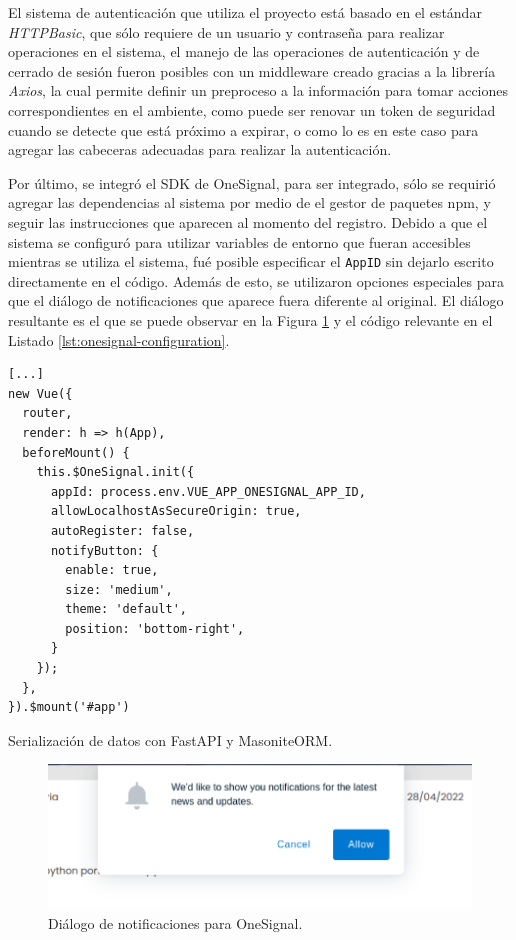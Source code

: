El sistema de autenticación que utiliza el proyecto está basado en el estándar \textit{HTTPBasic}, que sólo requiere de un usuario y contraseña para realizar operaciones en el sistema, el manejo de las operaciones de autenticación y de cerrado de sesión fueron posibles con un middleware creado gracias a la librería \textit{Axios}, la cual permite definir un preproceso a la información para tomar acciones correspondientes en el ambiente, como puede ser renovar un token de seguridad cuando se detecte que está próximo a expirar, o como lo es en este caso para agregar las cabeceras adecuadas para realizar la autenticación.


Por último, se integró el SDK de OneSignal, para ser integrado, sólo se requirió agregar las dependencias al sistema por medio de el gestor de paquetes npm, y seguir las instrucciones que aparecen al momento del registro. Debido a que el sistema se configuró para utilizar variables de entorno que fueran accesibles mientras se utiliza el sistema, fué posible especificar el \texttt{AppID} sin dejarlo escrito directamente en el código. Además de esto, se utilizaron opciones especiales para que el diálogo de notificaciones que aparece fuera diferente al original. El diálogo resultante es el que se puede observar en la Figura \ref{fig:onesignal-notifications-dialog} y el código relevante en el Listado \ref{lst:onesignal-configuration}.

\begin{listing}
\begin{verbatim}
[...]
new Vue({
  router,
  render: h => h(App),
  beforeMount() {
    this.$OneSignal.init({
      appId: process.env.VUE_APP_ONESIGNAL_APP_ID,
      allowLocalhostAsSecureOrigin: true,
      autoRegister: false,
      notifyButton: {
        enable: true,
        size: 'medium',
        theme: 'default',
        position: 'bottom-right',
      }
    });
  },
}).$mount('#app')
\end{verbatim}
\caption{Serialización de datos con FastAPI y MasoniteORM.}
\label{lst:onesignal-configuration}
\end{listing}

\begin{figure}[!ht]
	\centering
	\includegraphics[width=0.7\linewidth]{images/screenshots/2.0.1-onesignal-notifications.png}
	\caption{Diálogo de notificaciones para OneSignal.}
	\label{fig:onesignal-notifications-dialog}
\end{figure}
